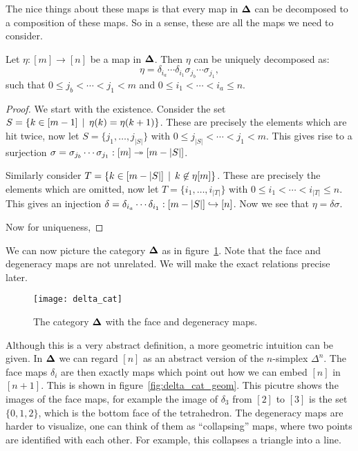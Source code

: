 The nice things about these maps is that every map in $\mathbf{\Delta}$ can be decomposed to a composition of these maps. So in a sense, these are all the maps we need to consider.

\begin{lemma}
	\label{le:epimono}
	Let $\eta : [m] \to [n]$ be a map in $\mathbf{\Delta}$. Then $\eta$ can be uniquely decomposed as:
	$$ \eta = \delta_{i_a} \cdots \delta_{i_1} \sigma_{j_b} \cdots \sigma_{j_1}, $$
	such that $0 \leq j_b < \cdots < j_1 < m$ and $0 \leq i_1 < \cdots < i_a \leq n$.
\end{lemma}
\begin{proof}
	We start with the existence. Consider the set $S = \{ k \in [m-1] \,\mid\, \eta(k) = \eta(k+1) \}$. These are precisely the elements which are hit twice, now let $S = \{ j_1, \ldots, j_{|S|} \}$ with $0 \leq j_{|S|} < \cdots < j_1 < m$. This gives rise to a surjection $\sigma = \sigma_{j_b} \cdots \sigma_{j_1}: [m] \twoheadrightarrow [m-|S|]$.

	Similarly consider $T = \{ k \in [m - |S|] \,\mid\, k \not \in \eta[m] \}$. These are precisely the elements which are omitted, now let $T = \{ i_1, \ldots, i_{|T|} \}$ with $0 \leq i_1 < \cdots < i_{|T|} \leq n$. This gives an injection $\delta = \delta_{i_a} \cdots \delta_{i_1} : [m - |S|] \hookrightarrow [n]$. Now we see that $\eta = \delta\sigma$.

	Now for uniqueness, 
\end{proof}

We can now picture the category $\mathbf{\Delta}$ as in figure~\ref{fig:delta_cat}. Note that the face and degeneracy maps are not unrelated. We will make the exact relations precise later.

\begin{figure}[h!]
	\texttt{[image: delta\_cat]}
	\caption{The category $\mathbf{\Delta}$ with the face and degeneracy maps.}
	\label{fig:delta_cat}
\end{figure}

Although this is a very abstract definition, a more geometric intuition can be given. In $\mathbf{\Delta}$ we can regard $[n]$ as an abstract version of the $n$-simplex $\Delta^n$. The face maps $\delta_i$ are then exactly maps which point out how we can embed $[n]$ in $[n+1]$. This is shown in figure~\ref{fig:delta_cat_geom}. This picutre shows the images of the face maps, for example the image of $\delta_3$ from $[2]$ to $[3]$ is the set $\{0,1,2\}$, which is the bottom face of the tetrahedron. The degeneracy maps are harder to visualize, one can think of them as ``collapsing'' maps, where two points are identified with each other. For example, this collapses a triangle into a line.

